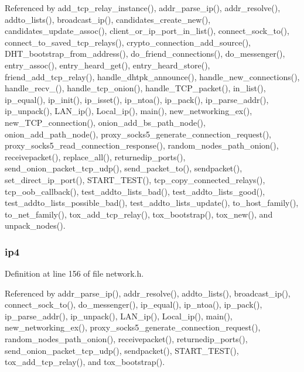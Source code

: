 Referenced by add\+\_\+tcp\+\_\+relay\+\_\+instance(), addr\+\_\+parse\+\_\+ip(), addr\+\_\+resolve(), addto\+\_\+lists(), broadcast\+\_\+ip(), candidates\+\_\+create\+\_\+new(), candidates\+\_\+update\+\_\+assoc(), client\+\_\+or\+\_\+ip\+\_\+port\+\_\+in\+\_\+list(), connect\+\_\+sock\+\_\+to(), connect\+\_\+to\+\_\+saved\+\_\+tcp\+\_\+relays(), crypto\+\_\+connection\+\_\+add\+\_\+source(), D\+H\+T\+\_\+bootstrap\+\_\+from\+\_\+address(), do\+\_\+friend\+\_\+connections(), do\+\_\+messenger(), entry\+\_\+assoc(), entry\+\_\+heard\+\_\+get(), entry\+\_\+heard\+\_\+store(), friend\+\_\+add\+\_\+tcp\+\_\+relay(), handle\+\_\+dhtpk\+\_\+announce(), handle\+\_\+new\+\_\+connections(), handle\+\_\+recv\+\_(), handle\+\_\+tcp\+\_\+onion(), handle\+\_\+\+T\+C\+P\+\_\+packet(), in\+\_\+list(), ip\+\_\+equal(), ip\+\_\+init(), ip\+\_\+isset(), ip\+\_\+ntoa(), ip\+\_\+pack(), ip\+\_\+parse\+\_\+addr(), ip\+\_\+unpack(), L\+A\+N\+\_\+ip(), Local\+\_\+ip(), main(), new\+\_\+networking\+\_\+ex(), new\+\_\+\+T\+C\+P\+\_\+connection(), onion\+\_\+add\+\_\+bs\+\_\+path\+\_\+node(), onion\+\_\+add\+\_\+path\+\_\+node(), proxy\+\_\+socks5\+\_\+generate\+\_\+connection\+\_\+request(), proxy\+\_\+socks5\+\_\+read\+\_\+connection\+\_\+response(), random\+\_\+nodes\+\_\+path\+\_\+onion(), receivepacket(), replace\+\_\+all(), returnedip\+\_\+ports(), send\+\_\+onion\+\_\+packet\+\_\+tcp\+\_\+udp(), send\+\_\+packet\+\_\+to(), sendpacket(), set\+\_\+direct\+\_\+ip\+\_\+port(), S\+T\+A\+R\+T\+\_\+\+T\+E\+S\+T(), tcp\+\_\+copy\+\_\+connected\+\_\+relays(), tcp\+\_\+oob\+\_\+callback(), test\+\_\+addto\+\_\+lists\+\_\+bad(), test\+\_\+addto\+\_\+lists\+\_\+good(), test\+\_\+addto\+\_\+lists\+\_\+possible\+\_\+bad(), test\+\_\+addto\+\_\+lists\+\_\+update(), to\+\_\+host\+\_\+family(), to\+\_\+net\+\_\+family(), tox\+\_\+add\+\_\+tcp\+\_\+relay(), tox\+\_\+bootstrap(), tox\+\_\+new(), and unpack\+\_\+nodes().

\hypertarget{struct_i_p_aca19646000f55aa927406e68fc41ecf9}{
\subsubsection[{ip4}]{ ip4}}\label{struct_i_p_aca19646000f55aa927406e68fc41ecf9}


Definition at line 156 of file network.\+h.



Referenced by addr\+\_\+parse\+\_\+ip(), addr\+\_\+resolve(), addto\+\_\+lists(), broadcast\+\_\+ip(), connect\+\_\+sock\+\_\+to(), do\+\_\+messenger(), ip\+\_\+equal(), ip\+\_\+ntoa(), ip\+\_\+pack(), ip\+\_\+parse\+\_\+addr(), ip\+\_\+unpack(), L\+A\+N\+\_\+ip(), Local\+\_\+ip(), main(), new\+\_\+networking\+\_\+ex(), proxy\+\_\+socks5\+\_\+generate\+\_\+connection\+\_\+request(), random\+\_\+nodes\+\_\+path\+\_\+onion(), receivepacket(), returnedip\+\_\+ports(), send\+\_\+onion\+\_\+packet\+\_\+tcp\+\_\+udp(), sendpacket(), S\+T\+A\+R\+T\+\_\+\+T\+E\+S\+T(), tox\+\_\+add\+\_\+tcp\+\_\+relay(), and tox\+\_\+bootstrap().

